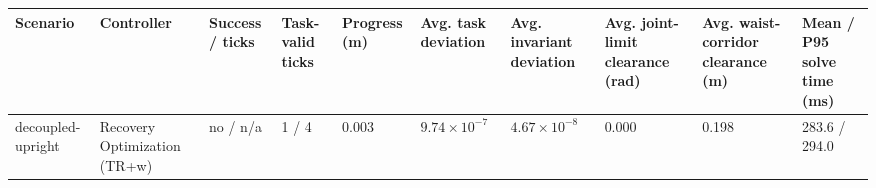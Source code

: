 \begin{tabular}{llllllllll}
\toprule
Scenario & Controller & Success / ticks & Task-valid ticks & Progress (m) & Avg. task deviation & Avg. invariant deviation & Avg. joint-limit clearance (rad) & Avg. waist-corridor clearance (m) & Mean / P95 solve time (ms) \\
\midrule
decoupled-upright & Recovery Optimization (TR+w) & no / n/a & 1 / 4 & 0.003 & $9.74\times 10^{-7}$ & $4.67\times 10^{-8}$ & 0.000 & 0.198 & 283.6 / 294.0 \\
\bottomrule
\end{tabular}
